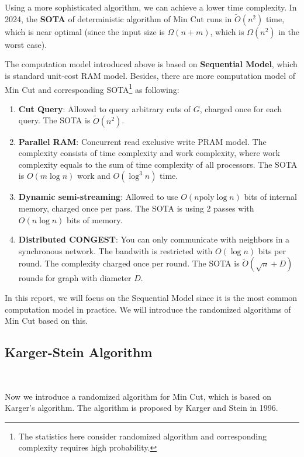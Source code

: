 \documentclass[12pt]{article}
\theoremstyle{plain}
\begin{document}
Using a more sophisticated algorithm, we can achieve a lower time complexity. In 2024, the \textbf{SOTA}\cite{doi:10.1137/1.9781611977912.111} of deterministic algorithm of Min Cut runs in $\tilde{O}(n^2)$ time, which is near optimal (since the input size is $\Omega(n+m)$, which is $\Omega(n^2)$ in the worst case).

The computation model introduced above is based on \textbf{Sequential Model}, which is standard unit-cost RAM model. Besides, there are more computation model of Min Cut and corresponding SOTA\footnote{The statistics here consider randomized algorithm and corresponding complexity requires high probability.} as following:
\begin{enumerate}
    \item \textbf{Cut Query}: Allowed to query arbitrary cuts of $G$, charged once for each query. The SOTA is $\tilde{O}(n^2)$\cite{mukhopadhyay2020weighted}.
    \item \textbf{Parallel RAM}: Concurrent read exclusive write PRAM model. The complexity consists of time complexity and work complexity, where work complexity equals to the sum of time complexity of all processors. The SOTA is $O(m\log n)$ work and $O(\log^3 n)$ time\cite{anderson2023parallel}.
    \item \textbf{Dynamic semi-streaming}: Allowed to use $O(n\text{poly}\log n)$ bits of internal memory, charged once per pass. The SOTA is using 2 passes with $O(n\log n)$ bits of memory\cite{assadi2021simple}.
    \item \textbf{Distributed CONGEST}: You can only communicate with neighbors in a synchronous network. The bandwith is restricted with $O(\log n)$ bits per round. The complexity charged once per round. The SOTA is $\tilde{O}(\sqrt{n}+D)$ rounds for graph with diameter $D$\cite{dory2021distributed}.
\end{enumerate}

In this report, we will focus on the Sequential Model since it is the most common computation model in practice. We will introduce the randomized algorithms of Min Cut based on this.

\subsection{Karger-Stein Algorithm}\

Now we introduce a randomized algorithm for Min Cut, which is based on Karger's algorithm\cite{inproceedings}. The algorithm is proposed by Karger and Stein in 1996\cite{karger1996new}.
\end{document}
